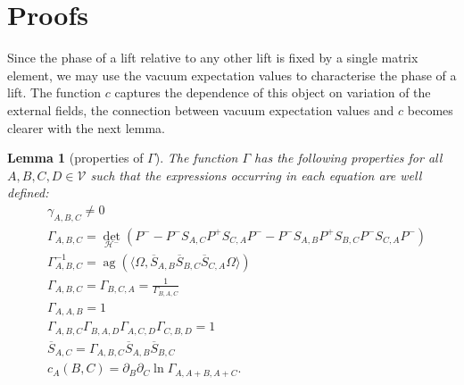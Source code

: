 \documentclass[b5paper,draft,openbib,12pt]{memoir}
\newtheorem{Lemma}[Def]{Lemma}
\DeclareMathOperator{\ag}{ag}
\begin{document}
\section{Proofs}


Since the phase of a lift relative to any other lift is fixed by a single matrix element, we may use the vacuum expectation values to characterise the
phase of a lift. The function \(c\) captures the dependence of this object on variation of the external fields, the connection between vacuum expectation
values and \(c\) becomes clearer with the next lemma.

\begin{Lemma}[properties of \(\Gamma\)]\label{gamma attri}
The function \(\Gamma\) has the following properties for all  \(A,B,C,D\in\mathcal{V}\) such that the expressions occurring in each equation are well defined:
\begin{align}\label{gamma attri0}
&\gamma_{A,B,C}\neq 0\\\label{gamma attri1}
&\Gamma_{A,B,C}=\det_{\mathcal{H}^-}(P^--P^-S_{A,C}P^+S_{C,A}P^- - P^- S_{A,B} P^+ S_{B,C} P^- S_{C,A} P^-)\\\label{gamma attri2}
&\Gamma_{A,B,C}^{-1}=\ag(\langle \Omega, \overline{S}_{A,B} \overline{S}_{B,C} \overline{S}_{C,A}\Omega\rangle )\\\label{gamma attri3}
&\Gamma_{A,B,C}=\Gamma_{B,C,A}=\frac{1}{\Gamma_{B,A,C}}\\\label{gamma attri4}
&\Gamma_{A,A,B}=1\\\label{gamma attri5}
&\Gamma_{A,B,C}\Gamma_{B,A,D}\Gamma_{A,C,D}\Gamma_{C,B,D}=1 \\\label{gamma attri6}
&\overline{S}_{A,C}=\Gamma_{A,B,C}\overline{S}_{A,B}\overline{S}_{B,C}\\\label{gamma attri7}
&c_A(B,C)=\partial_B \partial_C \ln \Gamma_{A,A+B,A+C}.
\end{align}
\end{Lemma}
\end{document}
